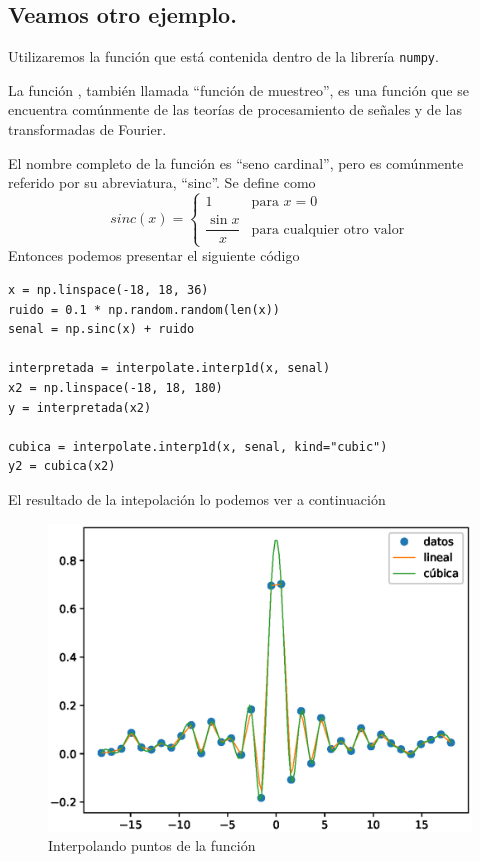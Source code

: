 \subsection*{Veamos otro ejemplo.}
Utilizaremos la función  que está contenida dentro de la librería \texttt{numpy}.
\par
La función , también llamada \enquote{función de muestreo}, es una función que se encuentra comúnmente de las teorías de procesamiento de señales y de las transformadas de Fourier.
\par
El nombre completo de la función es \enquote{seno cardinal}, pero es comúnmente referido por su abreviatura, \enquote{sinc}. Se define como
\[ sinc(x) = \begin{cases}
1 & \mbox{para } x = 0 \\
\dfrac{\sin x}{x} & \mbox{para cualquier otro valor} \end{cases}\]
Entonces podemos presentar el siguiente código
\begin{lstlisting}[caption=Inteporlando la función \funcionazul{sinx(x)}, basicstyle=\ttfamily\large, columns=fullflexible]
x = np.linspace(-18, 18, 36)
ruido = 0.1 * np.random.random(len(x))
senal = np.sinc(x) + ruido

interpretada = interpolate.interp1d(x, senal)
x2 = np.linspace(-18, 18, 180)
y = interpretada(x2)

cubica = interpolate.interp1d(x, senal, kind="cubic")
y2 = cubica(x2)
\end{lstlisting}
El resultado de la intepolación lo podemos ver a continuación
\begin{figure}[H]
	\centering
	\includegraphics[scale=0.9]{Imagenes/interpolacion_04.eps}
	\caption{Interpolando puntos de la función }
\end{figure}
